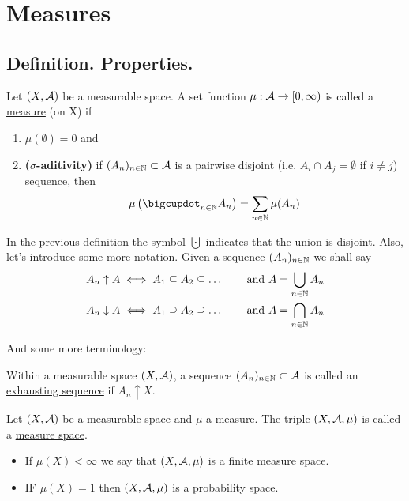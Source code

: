 
\chapter{Measures}

\section{Definition. Properties.}

\begin{dfn}[Measure]
	Let $(X, \mathcal{A})$ be a measurable space. A set function $\mu: \mathcal{A} \to [0, \infty)$ is called a \underline{measure} (on X) if
	\begin{enumerate}
		\item $\mu(\emptyset) = 0$ and
		\item \textbf{($\sigma$-aditivity)} if $(A_n)_{n\in \mathbb{N}} \subset \mathcal{A}$ is a pairwise disjoint (i.e. $A_i \cap A_j = \emptyset$ if $i \neq j$) sequence, then
		\begin{align*}
			\mu\left(\bigcupdot_{n \in \N} A_n\right) = \sum_{n\in \N} \mu(A_n)
		\end{align*}
	\end{enumerate}
\end{dfn}

In the previous definition the symbol $\bigcupdot$ indicates that the union is disjoint. Also, let's introduce some more notation. Given a sequence $(A_n)_{n \in \mathbb{N}}$ we shall say
\begin{align*}
	A_n \uparrow A \iff A_1 \subseteq A_2 \subseteq \dots &\qquad\text{ and } A = \bigcup_{n \in \mathbb{N}} A_n \\
	A_n \downarrow A \iff A_1 \supseteq A_2 \supseteq \dots &\qquad\text{ and } A = \bigcap_{n \in \mathbb{N}} A_n
\end{align*}

And some more terminology:

\begin{dfn}
	Within a measurable space $(X, \mathcal{A})$, a sequence $(A_n)_{n\in \mathbb{N}} \subset \mathcal{A}$ is called an \underline{exhausting sequence} if $A_n \uparrow X$.
\end{dfn}

\begin{dfn}
	Let $(X, \mathcal{A})$ be a measurable space and $\mu$ a measure. The triple $(X, \mathcal{A}, \mu)$ is called a \underline{measure space}.
	
	\begin{itemize}
		\item If $\mu(X) < \infty$ we say that $(X, \mathcal{A}, \mu)$ is a finite measure space.
		\item IF $\mu(X) = 1$ then $(X, \mathcal{A}, \mu)$ is a probability space.
	\end{itemize}
\end{dfn}


